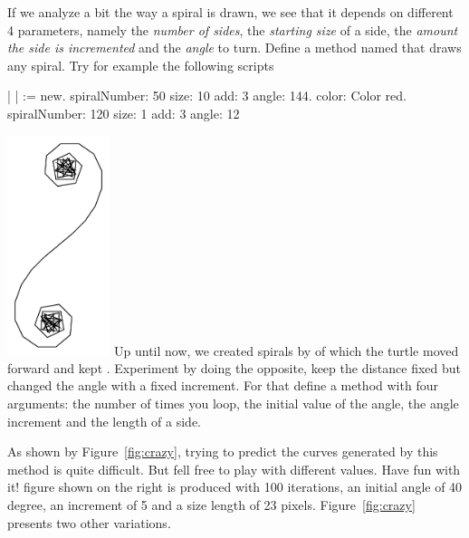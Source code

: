 \begin{exonofig}
If we analyze a bit the way a spiral is drawn, we see that it depends on different 4 parameters, namely the \emph{number of sides}, the \emph{starting size} of a side, the \emph{amount the side is incremented} and the \emph{angle} to turn. Define a method named  that draws any spiral. Try for example the following scripts

\begin{nalltt}
| \caro | 
\caro := \Turtle new.
\caro spiralNumber: 50 size: 10 add: 3 angle: 144.
\caro color: Color red.
\caro spiralNumber: 120 size: 1 add: 3 angle: 12
\end{nalltt}
\end{exonofig}

\begin{exofigwithsize}[0.5]{\includegraphics[width=3cm]{varLoopsfixedLengthOne}}\label{exo:crazy}
Up until now, we created spirals by  of which the turtle moved forward and kept . Experiment by doing the opposite, keep the distance fixed but changed the angle with a fixed increment.
For that define a method with four arguments: the number of times you loop, the initial value of the angle, the angle increment and the length of a side.

As shown by Figure~\ref{fig:crazy}, trying to predict the curves generated by this method is quite difficult.  But fell free to play with different values. Have fun with it!  figure shown on the right is produced with 100 iterations, an initial angle of 40 degree, an increment of 5 and a size length of 23 pixels. Figure~\ref{fig:crazy} presents two other variations.
\end{exofigwithsize}



